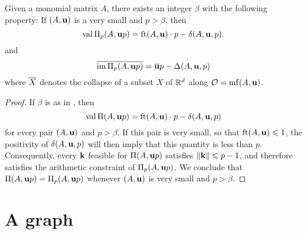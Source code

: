\documentclass[11pt]{amsart}
\begin{document}


\begin{theorem}
\label{arithmetic uniform value and image: T}   Given a monomial matrix $A$, there exists an integer $\beta$ with the following property\textup:  
If $(A, \mathbf{u})$ is a very small and $p > \beta$, then  \[ \operatorname{val} \Pi_p(A, \mathbf{u}p) = \operatorname{ft}(A, \mathbf{u}) \cdot p - \delta(A, \mathbf{u}, p). \] 
and 
\[ \overline{ \operatorname{im} \Pi_p(A, \mathbf{u}p)} = \overline{\mathbf{u}}p - \Delta(A, \mathbf{u}, p) \] where $\overline{X}$ denotes the collapse of a subset $X$ of $\mathbb{R}^d$ along $\mathcal{O} = \operatorname{mf}(A, \mathbf{u})$.
\end{theorem}

\begin{proof}  If $\beta$ is as in , then \[ \operatorname{val} \Pi(A, \mathbf{u}p) = \operatorname{ft}(A, \mathbf{u}) \cdot p - \delta(A, \mathbf{u}, p) \] for every pair $(A, \mathbf{u})$ and $p > \beta$.  If this pair is very small, so that $\operatorname{ft}(A, \mathbf{u}) \leqslant 1$, the positivity of $\delta(A, \mathbf{u},p)$ will then imply that this quantity is less than $p$.  Consequently, every $\mathbf{k}$ feasible for $\Pi(A, \mathbf{u}p)$ satisfies $\| \mathbf{k} \| \leqslant p-1$, and therefore satisfies the arithmetic constraint of $\Pi_p(A, \mathbf{u}p)$.  We conclude that $\Pi(A, \mathbf{u}p) = \Pi_p(A, \mathbf{u}p)$ whenever $(A, \mathbf{u})$ is very small and $p > \beta$.
\end{proof}





\newpage


\section{A graph}

\end{document}
